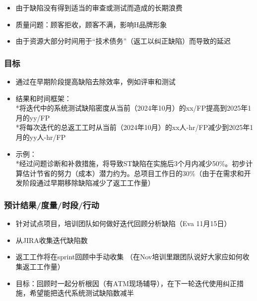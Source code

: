 \begin{itemize}
\tightlist
\item
  由于缺陷没有得到适当的审查或测试而造成的长期浪费\\
\item
  质量问题：顾客拒收，顾客不满，影响H品牌形象\\
\item
  由于资源大部分时间用于``技术债务''（返工以纠正缺陷）而导致的延迟\\
\end{itemize}

\hypertarget{ux76eeux6807}{%
\subsubsection{目标}\label{ux76eeux6807}}

\begin{itemize}
\tightlist
\item
  通过在早期阶段提高缺陷去除效率，例如评审和测试\\
\item
  结果和时间框架：\\
  *将迭代中的系统测试缺陷密度从当前（2024年10月）的xx/FP提高到2025年1月的yy/FP\\
  *将每次迭代的总返工工时从当前（2024年10月）的xx人-hr/FP减少到2025年1月的yy人-hr/FP\\
\item
  示例：\\
  *经过问题诊断和补救措施，将导致ST缺陷在实施后3个月内减少50\%。初步计算估计节省的努力（成本）潜力约为。总项目工作日的30\%（由于在需求和开发阶段通过早期移除缺陷减少了返工工作量）\\
\end{itemize}

\hypertarget{ux9884ux8ba1ux7ed3ux679cux5ea6ux91cfux65f6ux6bb5ux884cux52a8}{%
\subsubsection{预计结果/度量/时段/行动}\label{ux9884ux8ba1ux7ed3ux679cux5ea6ux91cfux65f6ux6bb5ux884cux52a8}}

\begin{itemize}
\tightlist
\item
  针对试点项目，培训团队如何做好迭代回顾分析缺陷（Eva 11月15日）\\
\item
  从JIRA收集迭代缺陷数\\
\item
  返工工作将在sprint回顾中手动收集
  （在Nov培训里跟团队说好大家应如何收集返工工作量）\\
\item
  目标：回顾时一起分析根因（有ATM现场辅导），在下一轮迭代使用纠正措施，希望能把迭代系统测试缺陷数减半\\
\end{itemize}

